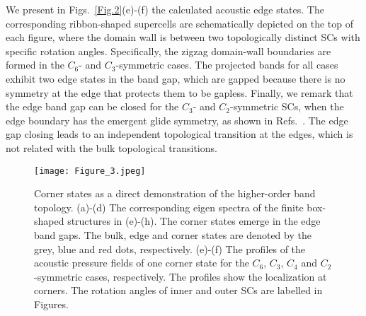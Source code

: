 \documentclass[doublecol]{epl2}
\begin{document}

We present in Figs.~\ref{Fig.2}(e)-(f) the calculated acoustic edge states. The corresponding ribbon-shaped supercells are schematically depicted on the top of each figure, where the domain wall is between two topologically distinct SCs with specific rotation angles. Specifically, the zigzag domain-wall boundaries are formed in the $C_6$- and $C_3$-symmetric cases. The projected bands for all cases exhibit  two edge states in the band gap, which are gapped because there is no symmetry at the edge that protects them to be gapless.  Finally, we remark that the edge band gap can be closed for the $C_3$- and $C_2$-symmetric SCs, when the edge boundary has the emergent glide symmetry, as shown in Refs.~\cite{zhang2019second,xiong2020corner}. The edge gap closing leads to an independent topological transition at the edges, which is not related with the bulk topological transitions.

\begin{figure*}[t]
\centering\texttt{[image: Figure\_3.jpeg]}
\caption{Corner states as a direct demonstration of the higher-order band topology. (a)-(d) The corresponding eigen spectra of the finite box-shaped structures in (e)-(h). The corner states emerge in the edge band gaps. The bulk, edge and corner states are denoted by the grey, blue and red dots, respectively. (e)-(f) The profiles of the acoustic pressure fields of one corner state for the $C_6$, $C_3$, $C_4$ and $C_2$-symmetric cases, respectively.  The profiles show the localization at corners. The rotation angles of inner and outer SCs are labelled in Figures.}
\label{Fig.3}
\end{figure*}
\end{document}
